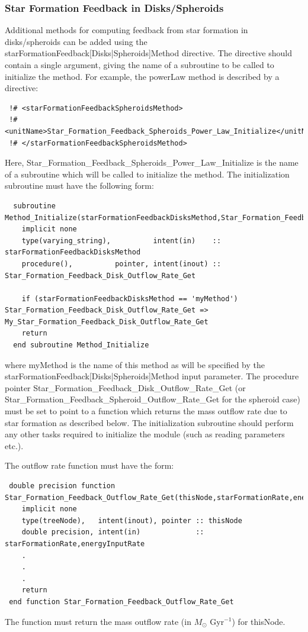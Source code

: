 \subsubsection{Star Formation Feedback in Disks/Spheroids}

Additional methods for computing feedback from star formation in disks/spheroids can be added using the {\normalfont \ttfamily starFormationFeedback[Disks|Spheroids]Method} directive. The directive should contain a single argument, giving the name of a subroutine to be called to initialize the method. For example, the {\normalfont \ttfamily powerLaw} method is described by a directive:
\begin{verbatim}
 !# <starFormationFeedbackSpheroidsMethod>
 !#  <unitName>Star_Formation_Feedback_Spheroids_Power_Law_Initialize</unitName>
 !# </starFormationFeedbackSpheroidsMethod>
\end{verbatim}
Here, {\normalfont \ttfamily Star\_Formation\_Feedback\_Spheroids\_Power\_Law\_Initialize} is the name of a subroutine which will be called to initialize the method. The initialization subroutine must have the following form:
\begin{verbatim}
  subroutine Method_Initialize(starFormationFeedbackDisksMethod,Star_Formation_Feedback_Disk_Outflow_Rate_Get)
    implicit none
    type(varying_string),          intent(in)    :: starFormationFeedbackDisksMethod
    procedure(),          pointer, intent(inout) :: Star_Formation_Feedback_Disk_Outflow_Rate_Get
    
    if (starFormationFeedbackDisksMethod == 'myMethod') Star_Formation_Feedback_Disk_Outflow_Rate_Get => My_Star_Formation_Feedback_Disk_Outflow_Rate_Get
    return
  end subroutine Method_Initialize
\end{verbatim}
where {\normalfont \ttfamily myMethod} is the name of this method as will be specified by the {\normalfont \ttfamily starFormationFeedback[Disks|Spheroids]Method} input parameter. The procedure pointer {\normalfont \ttfamily Star\_Formation\_Feedback\_Disk\_Outflow\_Rate\_Get} (or {\normalfont \ttfamily Star\_Formation\_Feedback\_Spheroid\_Outflow\_Rate\_Get} for the spheroid case) must be set to point to a function which returns the mass outflow rate due to star formation as described below. The initialization subroutine should perform any other tasks required to initialize the module (such as reading parameters etc.).

The outflow rate function must have the form:
\begin{verbatim}
 double precision function Star_Formation_Feedback_Outflow_Rate_Get(thisNode,starFormationRate,energyInputRate)
    implicit none
    type(treeNode),   intent(inout), pointer :: thisNode
    double precision, intent(in)             :: starFormationRate,energyInputRate
    .
    .
    .
    return
 end function Star_Formation_Feedback_Outflow_Rate_Get
\end{verbatim}
The function must return the mass outflow rate (in $M_\odot$ Gyr$^{-1}$) for {\normalfont \ttfamily thisNode}.

